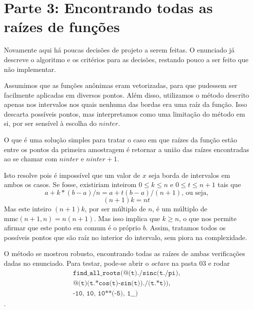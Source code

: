 \documentclass{article}
\begin{document}
\section{Parte 3: Encontrando todas as raízes de funções}
Novamente aqui há poucas decisões de projeto a serem feitas. O enunciado já descreve o algoritmo e os critérios para as decisões, restando pouco a ser feito que não implementar.  

Assumimos que as funções anônimas eram vetorizadas, para que pudessem ser facilmente aplicadas em diversos pontos. Além disso, utilizamos o método descrito apenas nos intervalos nos quais nenhuma das bordas era uma raíz da função. Isso descarta possíveis pontos, mas interpretamos como uma limitação do método em si, por ser sensível à escolha do $\textit{ninter}$.  

O que é uma solução simples para tratar o caso em que raízes da função estão entre os pontos da primeira amostragem é retornar a união das raízes encontradas ao se chamar com $\textit{ninter}$ e $\textit{ninter} + 1$.  

Isto resolve pois é impossível que um valor de $x$ seja borda de intervalos em ambos os casos. Se fosse, existiriam inteirom $0 \leq k \leq n$ e $0 \leq t \leq n+1$ tais que
$$ a + k*(b-a)/n = a + t(b-a)/(n+1) \text{, ou seja,}$$
$$(n+1)k = nt$$
Mas este inteiro $(n+1)k$, por ser múltiplo de $n$, é um múltiplo de $\mathrm{mmc}(n+1,n) = n(n+1)$. Mas isso implica que $k \geq n$, o que nos permite afirmar que este ponto em comum é o próprio $b$. Assim, tratamos todos os possíveis pontos que são raíz no interior do intervalo, sem piora na complexidade.  

O método se mostrou robusto, encontrando todas as raízes de ambas verificações dadas no enunciado. Para testar, pode-se abrir o \textit{octave} na pasta 03 e rodar 
\begin{equation*} \begin{split}
    \texttt{find\_all\_roots(@(t)./sinc(t./pi),} \\
    \texttt{@(t)(t.*cos(t)-sin(t))./(t.*t)),} \\
    \texttt{-10, 10, 10**(-5), 1\_\_ )}
\end{split} \end{equation*}.
\end{document}
